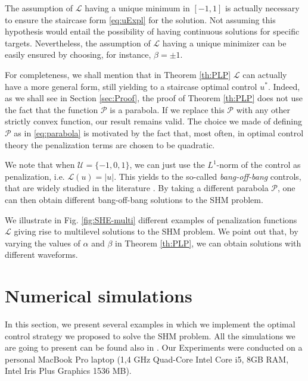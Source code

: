 \documentclass[9pt,shortpaper,twoside,web]{ieeecolor}
\begin{document}
The assumption of $\mathcal{L}$ having a unique minimum in $[-1,1]$ is actually necessary to ensure the staircase form \eqref{eq:uExpl} for the solution. Not assuming this hypothesis would entail the possibility of having continuous solutions for specific targets.
Nevertheless, the assumption of $\mathcal{L}$ having a unique minimizer can be easily ensured by choosing, for instance, $\beta=\pm 1$.

\begin{remark}
	For completeness, we shall mention that in Theorem \ref{th:PLP} $\mathcal L$ can actually have a more general form, still yielding to a staircase optimal control $u^\ast$. Indeed, as we shall see in Section \ref{sec:Proof}, the proof of Theorem \ref{th:PLP} does not use the fact that the function $\mathcal P$ is a parabola. If we replace this $\mathcal P$ with any other strictly convex function, our result remains valid. The choice we made of defining $\mathcal P$ as in \eqref{eq:parabola} is motivated by the fact that, most often, in optimal control theory the penalization terms are chosen to be quadratic.
\end{remark}

\begin{remark}
	We note that when  $\mathcal{U}= \{-1,0,1\}$, we can just use the $L^1$-norm of the control as penalization, i.e. $\mathcal{L}(u) = |u|$. This yields to the so-called \emph{bang-off-bang} controls, that are widely studied in the literature \cite{nagahara2013maximum,ikeda2016maximum}. By taking a different parabola $\mathcal{P}$, one can then obtain different bang-off-bang solutions to the SHM problem.
\end{remark}

We illustrate in Fig. \ref{fig:SHE-multi} different examples of penalization functions $\mathcal{L}$ giving rise to multilevel solutions to the SHM problem. We point out that, by varying the values of $\alpha$ and $\beta$ in Theorem \ref{th:PLP}, we can obtain solutions with different waveforms.

\section{Numerical simulations}\label{sec:Simulations}

In this section, we present several examples in which we implement the optimal control strategy we proposed to solve the SHM problem. All the simulations we are going to present can be found also in \cite{simus}. Our Experiments were conducted on a personal MacBook Pro laptop (1,4 GHz Quad-Core Intel Core i5, 8GB RAM, Intel Iris Plus Graphics 1536 MB). 
\end{document}
